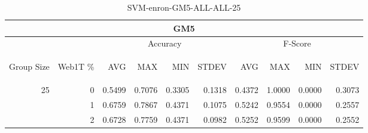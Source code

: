 \begin{center}
\begin{table}[htbp] 
 \begin{center}
\begin{tabular}{ | r | r | r | r | r | r | r | r | r | r |}
\hline
\multicolumn{10}{|c|}{GM5}\\
\hline
 & & \multicolumn{4}{|c|}{Accuracy} & \multicolumn{4}{|c|}{F-Score}\\ \cline{3-10}
\begin{sideways}Group Size\end{sideways} & \begin{sideways}Web1T \%\end{sideways} & \begin{sideways}AVG\end{sideways} & \begin{sideways}MAX\end{sideways} & \begin{sideways}MIN\end{sideways} & \begin{sideways}STDEV\end{sideways} & \begin{sideways}AVG\end{sideways} & \begin{sideways}MAX\end{sideways} & \begin{sideways}MIN\end{sideways} & \begin{sideways}STDEV\end{sideways}\\
\hline
\multirow{2}{*}{25}
 & 0 & 0.5499 & 0.7076 & 0.3305 & 0.1318 & 0.4372 & 1.0000 & 0.0000 & 0.3073\\ \cline{2-10}
 & 1 & 0.6759 & 0.7867 & 0.4371 & 0.1075 & 0.5242 & 0.9554 & 0.0000 & 0.2557\\ \cline{2-10}
 & 2 & 0.6728 & 0.7759 & 0.4371 & 0.0982 & 0.5252 & 0.9599 & 0.0000 & 0.2552\\ \cline{2-10}
\hline
\end{tabular}
\caption{SVM-enron-GM5-ALL-ALL-25}
\label{table:SVM-enron-GM5-ALL-ALL-25}
\end{center}
 \end{table}
\end{center}

